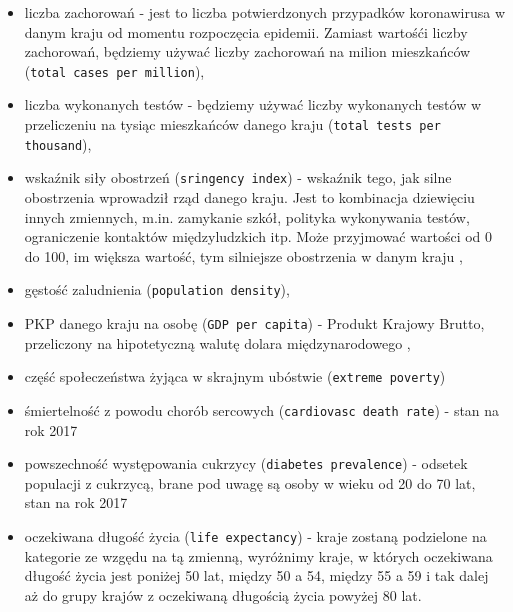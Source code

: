 \documentclass[12pt]{mwbk}
\theoremstyle{plain}
\theoremstyle{definition}
\theoremstyle{remark}
\newcommand\zrodlo[1]{\par\vspace{-3mm}{\small\textit{Źródło: }#1 }}
\begin{document}
\begin{itemize}
	\item liczba zachorowań - jest to liczba potwierdzonych przypadków koronawirusa w danym kraju od momentu rozpoczęcia epidemii. Zamiast wartośći liczby zachorowań, będziemy używać liczby zachorowań na milion mieszkańców (\texttt{total cases per million}),
	\item liczba wykonanych testów - będziemy używać liczby wykonanych testów w przeliczeniu na tysiąc mieszkańców danego kraju (\texttt{total tests per thousand}),
	\item wskaźnik siły obostrzeń (\texttt{sringency index}) - wskaźnik tego, jak silne obostrzenia wprowadził rząd danego kraju. Jest to kombinacja dziewięciu innych zmiennych, m.in. zamykanie szkół, polityka wykonywania testów, ograniczenie kontaktów międzyludzkich itp. Może przyjmować wartości od 0 do 100, im większa wartość, tym silniejsze obostrzenia w danym kraju \cite{stringency},
	\item gęstość zaludnienia (\texttt{population density}),
	\item PKP danego kraju na osobę (\texttt{GDP per capita}) - Produkt Krajowy Brutto, przeliczony na hipotetyczną walutę dolara międzynarodowego \cite{dollars},
	\item część społeczeństwa żyjąca w skrajnym ubóstwie (\texttt{extreme poverty})
	\item śmiertelność z powodu chorób sercowych (\texttt{cardiovasc death rate}) - stan na rok 2017
	\item powszechność występowania cukrzycy (\texttt{diabetes prevalence}) - odsetek populacji z cukrzycą, brane pod uwagę są osoby w wieku od 20 do 70 lat, stan na rok 2017
	\item oczekiwana długość życia (\texttt{life expectancy}) - kraje zostaną podzielone na kategorie ze wzgędu na tą zmienną, wyróżnimy kraje, w których oczekiwana długość życia jest poniżej 50 lat, między 50 a 54, między 55 a 59 i tak dalej aż do grupy krajów z oczekiwaną długością życia powyżej 80 lat.
	
\end{itemize}




\end{document}
